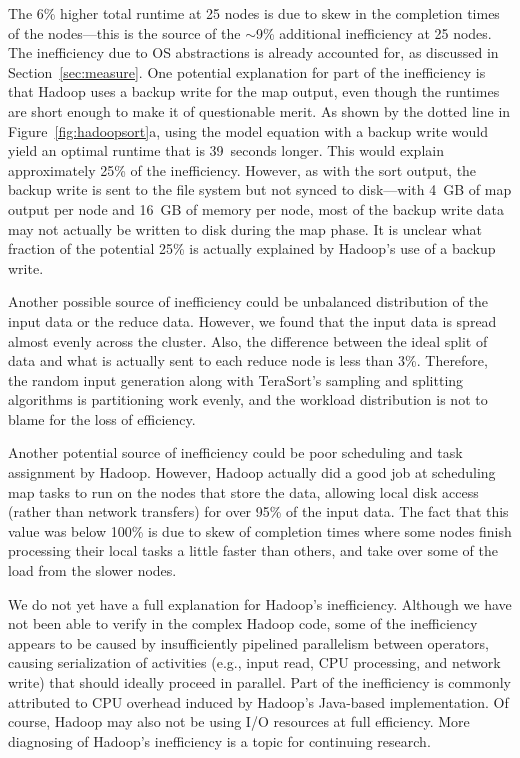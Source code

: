 The 6\% higher total runtime at 25 nodes is due to skew in the completion
times of the nodes---this is the source of the $\sim$9\% additional
inefficiency at 25 nodes.
The inefficiency due to OS abstractions is already accounted for, as
discussed in Section~\ref{sec:measure}.
One potential explanation for part of the inefficiency is that Hadoop
uses a backup write for the map output, even though the runtimes are
short enough to make it of questionable merit.
As shown by the dotted
line in Figure~\ref{fig:hadoopsort}a, using the model equation with
a backup write would yield an optimal runtime that is 39~seconds longer.
This would explain approximately 25\% of the inefficiency.
However, as with the sort output, the backup write is sent to the file
system but not synced to disk---with 4~GB of map output per node
and 16~GB of memory per node, most of the backup write data may not
actually be written to disk during the map phase.
It is unclear what fraction of the potential 25\% is actually
explained by Hadoop's use of a backup write.

Another possible source of inefficiency could be unbalanced 
distribution of the input data or the reduce data.
However, we found that the input data is spread almost evenly across the
cluster.
Also, the difference between the ideal split of data and what is
actually sent to each reduce node is less than 3\%.
Therefore, the random input generation along with TeraSort's sampling and
splitting algorithms is partitioning work evenly,
and the workload distribution is not to blame
for the loss of efficiency.

Another potential source of inefficiency could be poor scheduling and task
assignment by Hadoop.
However, Hadoop actually did a good job at scheduling map tasks to run
on the nodes that store the data, allowing local disk access (rather
than network transfers) for over 95\% of the input data.
The fact that this value was below 100\% is due to skew of
completion times where some nodes finish processing their local tasks
a little faster than others, and take over some of the load from the
slower nodes.

We do not yet have a full explanation for Hadoop's inefficiency.
Although we have not been able to verify in the complex Hadoop code,
some of the inefficiency appears to be caused by insufficiently pipelined
parallelism between operators, causing serialization of activities
(e.g., input read, CPU processing, and network write) that should
ideally proceed in parallel.
Part of the inefficiency is commonly attributed to CPU overhead
induced by Hadoop's Java-based implementation.
Of course, Hadoop may also not be using I/O resources at full efficiency.
More diagnosing of Hadoop's inefficiency is a topic for continuing
research.

